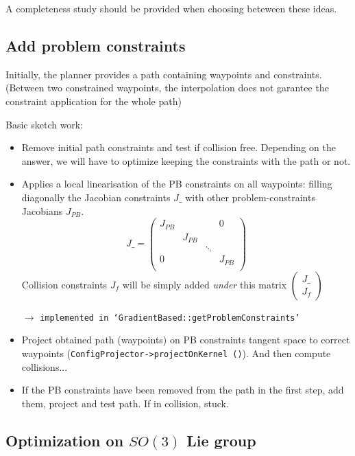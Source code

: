 \documentclass {article}
\begin{document}
A completeness study should be provided when choosing beteween these ideas.


\vspace{0.4cm}

\subsection{Add problem constraints}
Initially, the planner provides a path containing waypoints and constraints. 
(Between two constrained waypoints, the interpolation does not garantee the constraint 
application for the whole path)

Basic sketch work:
\begin{itemize}
\item Remove initial path constraints and test if collision free. Depending on the 
answer, we will have to optimize keeping the constraints with the path or not.
\item Applies a local linearisation of the PB constraints on all waypoints: filling 
diagonally the Jacobian constraints $J\_$ with other problem-constraints Jacobians $J_{PB}$.
$$
J\_ =
\left(\begin{array}{cccc}
J_{PB} & & &0\\
 & J_{PB} & \\
 &  & \ddots   \\
0& & & J_{PB} \\
\end{array}
\right)
$$
Collision constraints $J_f$ will be simply added \textit{under} this matrix
$
\begin{pmatrix}
J\_ \\
J_f 
\end{pmatrix}
$

$\rightarrow$ \texttt{implemented in `GradientBased::getProblemConstraints'}

\item Project obtained path (waypoints) on PB constraints tangent space to correct 
waypoints (\texttt{ConfigProjector->projectOnKernel ()}). And then compute collisions...
\item If the PB constraints have been removed from the path in the first step, add 
them, project and test path. If in collision, stuck.
\end{itemize}



\vspace{0.4cm}

\subsection{Optimization on $SO(3)$ Lie group}
\end{document}
